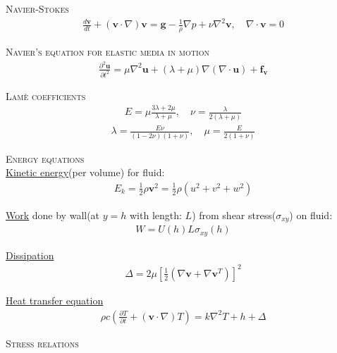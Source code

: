 \documentclass[11pt,a4paper,english]{article}
\begin{document}
{\scshape Navier-Stokes} 
\begin{align*}
\frac{d \mathbf{v}}{dt} + (\mathbf{v} \cdot \nabla)\mathbf{v} = \mathbf{g} - \frac{1}{\rho} \nabla p + \nu \nabla^2 \mathbf{v}, \quad \nabla \cdot \mathbf{v} = 0  
\end{align*}

{\scshape Navier's equation for elastic media in motion} \\
\begin{align*}
\frac{\partial^2 \mathbf{u}}{\partial t^2} = \mu \nabla^2 \mathbf{u} + (\lambda + \mu) \nabla ( \nabla \cdot \mathbf{u}) + \mathbf{f_v}
\end{align*}

{\scshape Lamè coefficients} 
\begin{align*}
E=\mu \frac{3\lambda + 2\mu}{\lambda + \mu}, \quad \nu = \frac{\lambda}{2(\lambda + \mu)}
\end{align*}
\begin{align*}
\lambda = \frac{E \nu}{(1-2\nu)(1+\nu)}, \quad \mu = \frac{E}{2(1+\nu)}
\end{align*}

\vspace{1cm}

{\scshape Energy equations} \\

\underline{Kinetic energy}(per volume) for fluid:
\begin{align*}
E_k = \frac{1}{2} \rho \mathbf{v}^2 = \frac{1}{2} \rho (u^2 + v^2 + w^2) 
\end{align*}

\underline{Work} done by wall(at $y=h$ with length: $L$) from shear stress($\sigma_{xy}$) on fluid:
\begin{align*}
W = U(h) L \sigma_{xy}(h)
\end{align*}

\underline{Dissipation}
\begin{align*}
\Delta = 2 \mu [\frac{1}{2} (\nabla \mathbf{v}  + \nabla \mathbf{v}^T  ) ]^2
\end{align*}

\underline{Heat transfer equation}
\begin{align*}
\rho c \left(\frac{\partial T}{\partial t} + (\mathbf{v} \cdot \nabla)T \right) = k \nabla^2 T + h + \Delta 
\end{align*}

\vspace{1cm}

{\scshape Stress relations} \\
\end{document}
